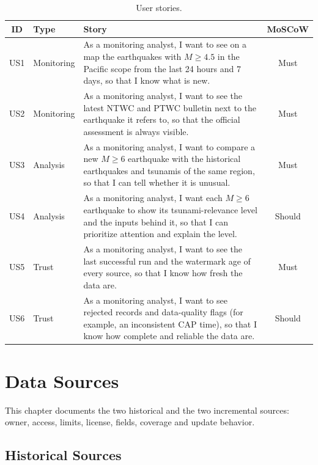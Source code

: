 \documentclass[a4paper,11pt,oneside]{book}
\begin{document}
\begin{table}[H]
\centering
\small
\begin{tabularx}{\textwidth}{@{}cl>{\raggedright\arraybackslash}Xc@{}}
\toprule
ID & Type & Story & MoSCoW \\
\midrule
US1 & Monitoring & As a monitoring analyst, I want to see on a map the earthquakes with $M \geq 4.5$ in the Pacific scope from the last 24 hours and 7 days, so that I know what is new. & Must \\
US2 & Monitoring & As a monitoring analyst, I want to see the latest NTWC and PTWC bulletin next to the earthquake it refers to, so that the official assessment is always visible. & Must \\
US3 & Analysis & As a monitoring analyst, I want to compare a new $M \geq 6$ earthquake with the historical earthquakes and tsunamis of the same region, so that I can tell whether it is unusual. & Must \\
US4 & Analysis & As a monitoring analyst, I want each $M \geq 6$ earthquake to show its tsunami-relevance level and the inputs behind it, so that I can prioritize attention and explain the level. & Should \\
US5 & Trust & As a monitoring analyst, I want to see the last successful run and the watermark age of every source, so that I know how fresh the data are. & Must \\
US6 & Trust & As a monitoring analyst, I want to see rejected records and data-quality flags (for example, an inconsistent CAP time), so that I know how complete and reliable the data are. & Should \\
\bottomrule
\end{tabularx}
\caption{User stories.}
\label{tab:stories}
\end{table}

\chapter{Data Sources}
\label{ch:sources}
This chapter documents the two historical and the two incremental sources: owner, access, limits, license, fields, coverage and update behavior.

\section{Historical Sources}
\label{sec:historical}
\end{document}
